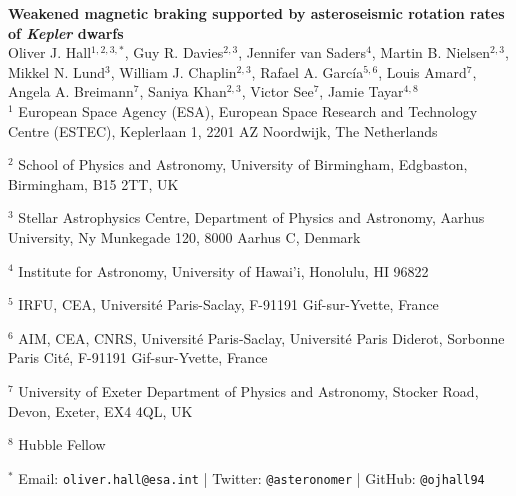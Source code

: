 \documentclass[12pt]{article}
\renewcommand*{\thefootnote}{\fnsymbol{footnote}}
\begin{document}
\noindent\textbf{\LARGE{Weakened magnetic braking supported by asteroseismic rotation rates of \textit{Kepler} dwarfs}}\\

\noindent Oliver J. Hall$^{1,2,3,*}$,
	Guy R. Davies$^{2,3}$, 
	Jennifer van Saders$^{4}$,
	Martin B. Nielsen$^{2,3}$,
	Mikkel N. Lund$^{3}$, 
	William J. Chaplin$^{2,3}$, 
	Rafael A. Garc\'ia$^{5, 6}$, 
	Louis Amard$^{7}$,
	Angela A. Breimann$^{7}$, 
	Saniya Khan$^{2,3}$, 
	Victor See$^{7}$, 
	Jamie Tayar$^{4, 8}$
	\\
	
	\noindent $^{1}$ European Space Agency (ESA), European Space Research and Technology Centre (ESTEC), Keplerlaan 1, 2201 AZ Noordwijk, The Netherlands

	\noindent 	$^{2}$ School of Physics and Astronomy, University of Birmingham, Edgbaston, Birmingham, B15 2TT, UK

	\noindent 	$^{3}$ Stellar Astrophysics Centre, Department of Physics and Astronomy, Aarhus University, Ny Munkegade 120, 8000 Aarhus C, Denmark

	\noindent 	$^{4}$ Institute for Astronomy, University of Hawai'i, Honolulu, HI 96822

	\noindent 	$^{5}$ IRFU, CEA, Universit\'e Paris-Saclay, F-91191 Gif-sur-Yvette, France

	\noindent 	$^{6}$ AIM, CEA, CNRS, Universit\'e Paris-Saclay, Universit\'e Paris Diderot, Sorbonne Paris Cit\'e, F-91191 Gif-sur-Yvette, France

	\noindent 	$^{7}$ University of Exeter Department of Physics and Astronomy, Stocker Road, Devon, Exeter, EX4 4QL, UK
	
	\noindent $^{8}$ Hubble Fellow
	
	\noindent $^{*}$ Email: \texttt{oliver.hall@esa.int} | Twitter: \texttt{@asteronomer} | GitHub: \texttt{@ojhall94}


\vspace{10mm}

\renewcommand*{\thefootnote}{\arabic{footnote}}
\setcounter{footnote}{0}
\end{document}
